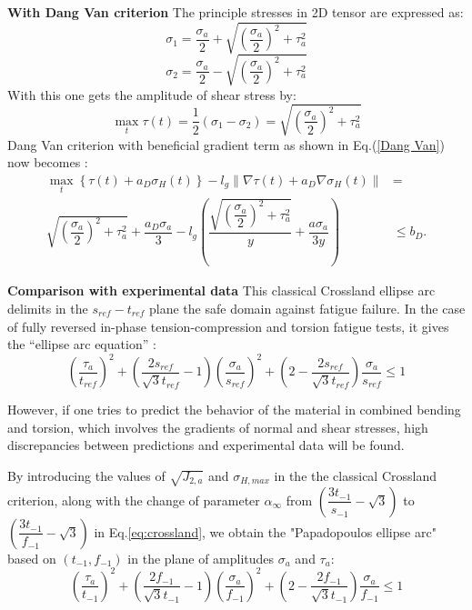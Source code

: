 \documentclass[3p,times,procedia,number]{elsarticle}
\begin{document}
\textbf{With Dang Van criterion}
The principle stresses in 2D tensor are expressed as:
$$\sigma_1=\dfrac{\sigma_a}{2}+\sqrt{\left( \dfrac{\sigma_a}{2}\right)^2+\tau_a^2 }$$
$$\sigma_2=\dfrac{\sigma_a}{2}-\sqrt{\left( \dfrac{\sigma_a}{2}\right)^2+\tau_a^2 }$$
With this one gets the amplitude of shear stress by:
$$\max\limits_{t}\tau(t)=\dfrac{1}{2}(\sigma_1-\sigma_2)=\sqrt{\left( \dfrac{\sigma_a}{2}\right)^2+\tau_a^2 }$$
Dang Van criterion with beneficial gradient term as shown in Eq.(\ref{Dang Van}) now becomes :
\begin{equation}
\begin{split}
\max\limits_{t}\left\{\tau{(t)}+a_D\sigma_H(t)\right\}-l_g\parallel{\nabla\tau{(t)}}+a_D\nabla\sigma_H(t)\parallel&=
\\\sqrt{\left(\dfrac{\sigma_a}{2}\right)^2+\tau_a^2}+\dfrac{a_D\sigma_a}{3}-l_g\left( \dfrac{\sqrt{\left(\dfrac{\sigma_a}{2}\right)^2+\tau_a^2}}{y}+\dfrac{a\sigma_a}{3y}\right) &\leqslant b_D.
\end{split}
\label{Dang Van}
\end{equation}

\textbf{Comparison with experimental data}
This classical Crossland ellipse arc delimits in the $s_{ref}-t_{ref}$  plane the safe domain against fatigue failure. In the case of fully reversed in-phase tension-compression and torsion fatigue tests, it gives the ``ellipse arc equation''\cite{Papadopoulos1996513} :
\begin{equation}
\left( \dfrac{\tau_a}{t_{ref}}\right) ^2+\left( \dfrac{2s_{ref}}{\sqrt{3}t_{ref}}-1\right) \left( \dfrac{\sigma_a}{s_{ref}}\right) ^2+\left( 2-\dfrac{2s_{ref}}{\sqrt{3}t_{ref}}\right) \dfrac{\sigma_a}{s_{ref}}\leqslant 1
\label{crossland}
\end{equation}

However, if one tries to predict the behavior of the material in combined bending and torsion, which involves  the gradients of normal and shear stresses, high discrepancies between predictions and experimental data will be found. 

By introducing the values of $\sqrt{J_{2,a}}$ and $\sigma_{H,max}$ in the the classical Crossland criterion, along with the change of parameter $\alpha_\infty$  from $\left(\dfrac{3 t_{-1}}{s_{-1}}-\sqrt{3}\right)$ to $\left(\dfrac{3 t_{-1}}{f_{-1}}-\sqrt{3}\right)$ in Eq.\eqref{eq:crossland}, we obtain the "Papadopoulos ellipse arc" based on $\left(t_{-1},f_{-1} \right) $ in the plane of amplitudes $\sigma_a$ and $\tau_a$:
\begin{equation}
\left(\dfrac{\tau_a}{t_{-1}}\right)^2+\left(\dfrac{2f_{-1}}{\sqrt{3}t_{-1}}-1\right)\left(\dfrac{\sigma_a}{f_{-1}}\right)^2+\left(2-\dfrac{2f_{-1}}{\sqrt{3}t_{-1}}\right)\dfrac{\sigma_a}{f_{-1}}\leqslant 1
\label{papa}
\end{equation}
\end{document}
